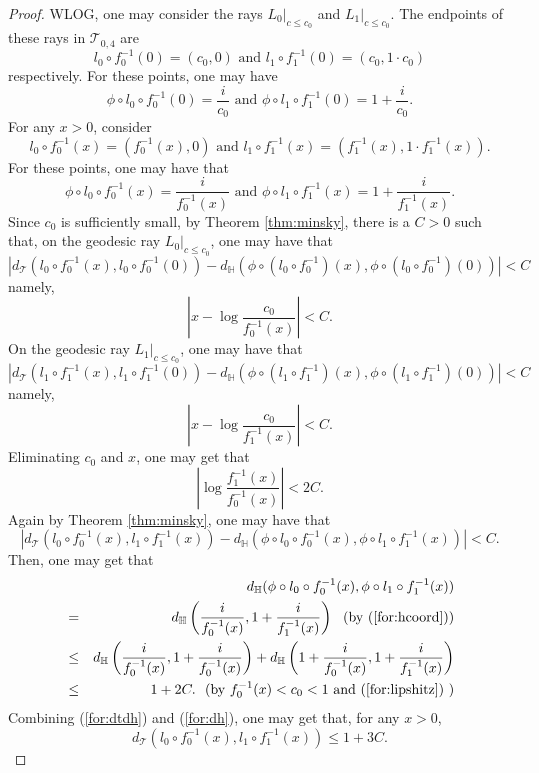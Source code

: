 \documentclass[UTF8]{amsart}
\numberwithin{equation}{section}
\theoremstyle{definition}
\theoremstyle{example}
\theoremstyle{remark}
\begin{document}
\begin{proof}
 WLOG, one may consider the rays $L_0|_{c \le c_0}$ and $L_1|_{c \le c_0}$. 
 The endpoints of these rays in $\mathcal{T}_{0,4}$ are $$l_0\circ f^{-1}_0(0) = (c_0, 0)\text{ and }l_1\circ f^{-1}_1(0) = (c_0, 1\cdot c_0)$$ respectively. For these points, one may have $$\phi\circ l_0\circ f^{-1}_0(0) = \frac{i}{c_0}\text{ and }\phi\circ l_1\circ f^{-1}_1(0) = 1+\frac{i}{c_0}.$$ 
 For any $x>0$, consider $$l_0\circ f^{-1}_0(x) = (f_0^{-1}(x),0) \text{ and }l_1\circ f^{-1}_1(x) = (f_1^{-1}(x),1\cdot f_1^{-1}(x)) .$$
 For these points, one may have that
\begin{equation}
\phi\circ l_0\circ f^{-1}_0(x) =  \frac{i}{f_0^{-1}(x)} \text{ and }\phi\circ l_1\circ f^{-1}_1(x) = 1+ \frac{i}{f_1^{-1}(x)}. 
\label{for:hcoord}
\end{equation}
 Since $c_0$ is sufficiently small, by Theorem \ref{thm:minsky}, there is a $C>0$ such that, on the geodesic ray $L_0|_{c \le c_0}$, one may have that
 \[
  |d_{\mathcal{T}}(l_0\circ f^{-1}_0(x), l_0\circ f^{-1}_0(0)) - d_{\mathbb{H}} (\phi\circ(l_0\circ f^{-1}_0)(x), \phi\circ(l_0\circ f^{-1}_0)(0)) |  < C 
 \]
namely,
 \[
 \left|x - \log \frac{c_0}{f_0^{-1}(x)} \right| <C. 
 \]
On the geodesic ray $L_1|_{c \le c_0}$, one may have that
 \[
 |d_{\mathcal{T}}(l_1\circ f^{-1}_1(x), l_1\circ f^{-1}_1(0)) - d_{\mathbb{H}} (\phi\circ(l_1\circ f^{-1}_1)(x), \phi\circ(l_1\circ f^{-1}_1)(0)) |  < C 
 \]
 namely,
 \[
 \left|x - \log \frac{c_0}{f_1^{-1}(x)} \right| <C.   
 \]
 Eliminating $c_0$ and $x$, one may get that
 \begin{equation}
  \left| \log \frac{f^{-1}_1(x)}{f^{-1}_0(x)} \right| < 2C . 
  \label{for:lipshitz}
 \end{equation}
 Again by Theorem \ref{thm:minsky}, one may have that
 \begin{equation}
  |d_{\mathcal{T}}(l_0\circ f_0^{-1}(x), l_1\circ f_1^{-1}(x)) - d_{\mathbb{H}}(\phi\circ l_0\circ f_0^{-1}(x), \phi\circ l_1\circ f_1^{-1}(x))| < C. 
  \label{for:dtdh}
 \end{equation}
 Then, one may get that
 \begin{eqnarray}
  & & d_{\mathbb{H}}(\phi\circ l_0 \circ f_0^{-1}(x), \phi\circ l_1 \circ f_1^{-1}(x))\nonumber \\
  &=& d_{\mathbb{H}}\left( \frac{i}{f_0^{-1}(x)}, 1+\frac{i}{f_1^{-1}(x)} \right) \nonumber\,\,\,\,\text{(by (\ref{for:hcoord}))}\\
  & \le & d_{\mathbb{H}}\left( \frac{i}{f_0^{-1}(x)}, 1+\frac{i}{f_0^{-1}(x)} \right) + d_{\mathbb{H}}\left( 1+\frac{i}{f_0^{-1}(x)}, 1+\frac{i}{f_1^{-1}(x)} \right) \nonumber\\
  & \le & 1+2C. \,\,\,\,\text{(by }f_0^{-1}(x) < c_0 <1 \text{ and (\ref{for:lipshitz}) )} \label{for:dh}
 \end{eqnarray}
 Combining (\ref{for:dtdh}) and (\ref{for:dh}), one may get that, for any $x>0$, 
 \[
 d_{\mathcal{T}}(l_0\circ f_0^{-1}(x), l_1\circ f_1^{-1}(x)) \le 1+3C.  
 \]


\end{proof}
\end{document}
